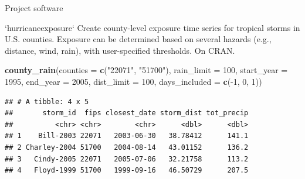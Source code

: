 \documentclass[ignorenonframetext,]{beamer}
\newenvironment{Shaded}{\begin{snugshade}}{\end{snugshade}}
\newcommand{\KeywordTok}[1]{\textcolor[rgb]{0.13,0.29,0.53}{\textbf{{#1}}}}
\newcommand{\DataTypeTok}[1]{\textcolor[rgb]{0.13,0.29,0.53}{{#1}}}
\newcommand{\DecValTok}[1]{\textcolor[rgb]{0.00,0.00,0.81}{{#1}}}
\newcommand{\StringTok}[1]{\textcolor[rgb]{0.31,0.60,0.02}{{#1}}}
\newcommand{\NormalTok}[1]{{#1}}
\begin{document}
\begin{frame}[fragile]{Project software}

\footnotesize

\begin{block}{`hurricaneexposure`}
Create county-level exposure time series for tropical storms in U.S. counties. Exposure can be determined based on several hazards (e.g., distance, wind, rain), with user-specified thresholds. On CRAN.
\end{block}

\begin{Shaded}
\begin{Highlighting}[]
\KeywordTok{county_rain}\NormalTok{(}\DataTypeTok{counties =} \KeywordTok{c}\NormalTok{(}\StringTok{"22071"}\NormalTok{, }\StringTok{"51700"}\NormalTok{), }\DataTypeTok{rain_limit =} \DecValTok{100}\NormalTok{, }
            \DataTypeTok{start_year =} \DecValTok{1995}\NormalTok{, }\DataTypeTok{end_year =} \DecValTok{2005}\NormalTok{, }\DataTypeTok{dist_limit =} \DecValTok{100}\NormalTok{,}
            \DataTypeTok{days_included =} \KeywordTok{c}\NormalTok{(-}\DecValTok{1}\NormalTok{, }\DecValTok{0}\NormalTok{, }\DecValTok{1}\NormalTok{))}
\end{Highlighting}
\end{Shaded}

\begin{verbatim}
## # A tibble: 4 x 5
##       storm_id  fips closest_date storm_dist tot_precip
##          <chr> <chr>        <chr>      <dbl>      <dbl>
## 1    Bill-2003 22071   2003-06-30   38.78412      141.1
## 2 Charley-2004 51700   2004-08-14   43.01152      136.2
## 3   Cindy-2005 22071   2005-07-06   32.21758      113.2
## 4   Floyd-1999 51700   1999-09-16   46.50729      207.5
\end{verbatim}

\end{frame}
\end{document}
